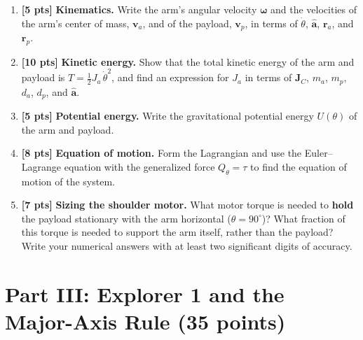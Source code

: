 \documentclass[11pt,letterpaper]{article}
\newcommand{\answerspace}[1]{\par\vspace{#1}}
\newcommand{\exampagebreak}{\newpage}
\newcommand{\pts}[1]{\textbf{[#1 pts]}}
\newcommand{\bw}{\boldsymbol{\omega}}
\begin{document}
\exampagebreak

\begin{enumerate}[label=(\alph*)]

\item \pts{5} \textbf{Kinematics.} Write the arm's angular velocity $\bw$ and the velocities of the arm's center of mass, $\mathbf{v}_a$, and of the payload, $\mathbf{v}_p$, in terms of $\dot\theta$, $\hat{\mathbf{a}}$, $\mathbf{r}_a$, and $\mathbf{r}_p$.
\answerspace{2.6in}

\item \pts{10} \textbf{Kinetic energy.} Show that the total kinetic energy of the arm and payload is $T = \tfrac12 J_a\,\dot\theta^2$, and find an expression for $J_a$ in terms of $\mathbf{J}_C$, $m_a$, $m_p$, $d_a$, $d_p$, and $\hat{\mathbf{a}}$.
\answerspace{4.6in}
\exampagebreak

\item \pts{5} \textbf{Potential energy.} Write the gravitational potential energy $U(\theta)$ of the arm and payload.
\answerspace{2.6in}

\item \pts{8} \textbf{Equation of motion.} Form the Lagrangian and use the Euler--Lagrange equation with the generalized force $Q_\theta = \tau$ to find the equation of motion of the system.
\answerspace{4.2in}
\exampagebreak

\item \pts{7} \textbf{Sizing the shoulder motor.} What motor torque is needed to \textbf{hold} the payload stationary with the arm horizontal ($\theta = 90^\circ$)? What fraction of this torque is needed to support the arm itself, rather than the payload? Write your numerical answers with at least two significant digits of accuracy.
\answerspace{5.5in}

\end{enumerate}

\newpage
\section*{Part III: Explorer 1 and the Major-Axis Rule \hfill (35 points)}
\end{document}
